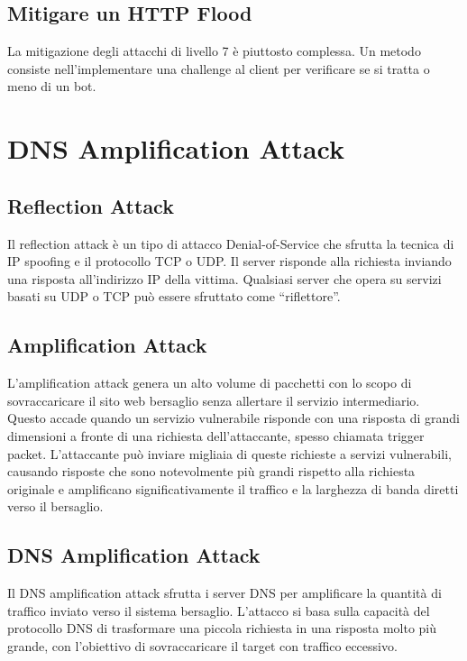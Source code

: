 \subsection{Mitigare un HTTP Flood}

La mitigazione degli attacchi di livello 7 è piuttosto complessa. Un metodo consiste nell'implementare una challenge al client per verificare se si tratta o meno di un bot.

\section{DNS Amplification Attack}

\subsection{Reflection Attack}

Il reflection attack è un tipo di attacco Denial-of-Service che sfrutta la tecnica di IP spoofing e il protocollo TCP o UDP. Il server risponde alla richiesta inviando una risposta all'indirizzo IP della vittima. Qualsiasi server che opera su servizi basati su UDP o TCP può essere sfruttato come ``riflettore''.

\subsection{Amplification Attack}

L'amplification attack genera un alto volume di pacchetti con lo scopo di sovraccaricare il sito web bersaglio senza allertare il servizio intermediario. Questo accade quando un servizio vulnerabile risponde con una risposta di grandi dimensioni a fronte di una richiesta dell'attaccante, spesso chiamata trigger packet. L'attaccante può inviare migliaia di queste richieste a servizi vulnerabili, causando risposte che sono notevolmente più grandi rispetto alla richiesta originale e amplificano significativamente il traffico e la larghezza di banda diretti verso il bersaglio.

\subsection{DNS Amplification Attack}

Il DNS amplification attack sfrutta i server DNS per amplificare la quantità di traffico inviato verso il sistema bersaglio. L'attacco si basa sulla capacità del protocollo DNS di trasformare una piccola richiesta in una risposta molto più grande, con l'obiettivo di sovraccaricare il target con traffico eccessivo.


